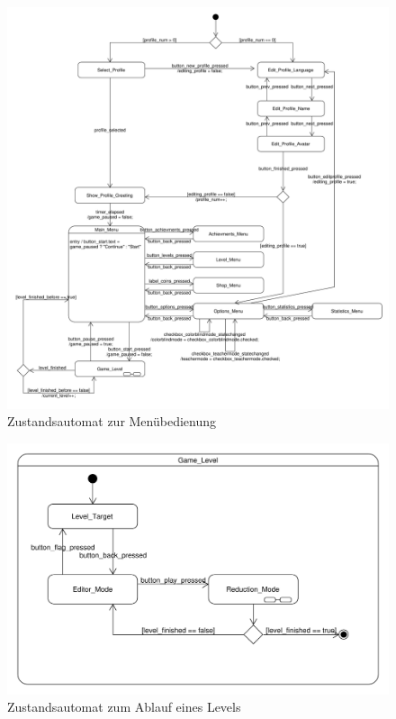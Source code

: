 \begin{figure}[H]
\centering
\includegraphics[scale=0.4]{../system_models/dynamic_models/menu_state_machine.pdf}
\caption{Zustandsautomat zur Menübedienung}
\end{figure}

\begin{figure}[H]
\centering
\includegraphics[scale=0.55]{../system_models/dynamic_models/game_level_state_machine.pdf}
\caption{Zustandsautomat zum Ablauf eines Levels}
\end{figure}

